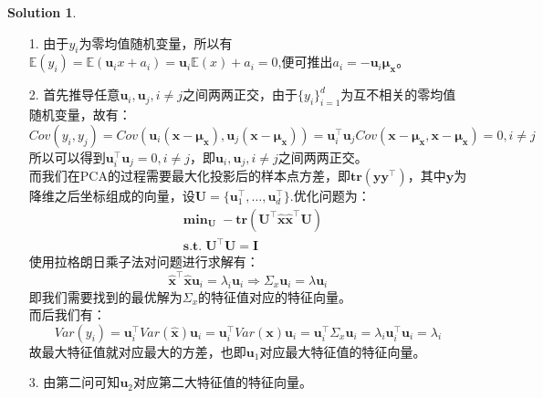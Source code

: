 \documentclass[a4paper,UTF8]{article}
\theoremstyle{definition}
\newtheorem*{solution}{Solution}
\begin{document}
\begin{solution}
	\begin{enumerate}
		\item [1.]
		      由于$y_i$为零均值随机变量，所以有$\mathbb{E}(y_i) = \mathbb{E}(\boldsymbol{u}_i x+a_i) =\boldsymbol{u}_i\mathbb{E}(x)+a_i = 0$,便可推出$a_i=-\boldsymbol{u}_i\boldsymbol{\mu}_{\boldsymbol{x}}$。
		\item [2.]
		      首先推导任意$\boldsymbol{u}_i,\boldsymbol{u}_j,i\neq j$之间两两正交，由于$\{y_i\}_{i=1}^d$为互不相关的零均值随机变量，故有：
		      \[Cov(y_i,y_j) = Cov(\boldsymbol{u}_i(\boldsymbol{x}-\boldsymbol{\mu}_{\boldsymbol{x}}),\boldsymbol{u}_j(\boldsymbol{x}-\boldsymbol{\mu}_{\boldsymbol{x}})) = \boldsymbol{u}_i^{\top}\boldsymbol{u}_jCov(\boldsymbol{x}-\boldsymbol{\mu}_{\boldsymbol{x}},\boldsymbol{x}-\boldsymbol{\mu}_{\boldsymbol{x}}) = 0,i\neq j\]
		      所以可以得到$\boldsymbol{u}_i^{\top}\boldsymbol{u}_j = 0,i\neq j$，即$\boldsymbol{u}_i,\boldsymbol{u}_j,i\neq j$之间两两正交。\\
		      而我们在PCA的过程需要最大化投影后的样本点方差，即$\textbf{tr}(\boldsymbol{y}\boldsymbol{y}^{\top})$，其中$\boldsymbol{y}$为降维之后坐标组成的向量，设$\boldsymbol{U} = \{\boldsymbol{u}_1^{\top},\ldots,\boldsymbol{u}_d^{\top}\}$.优化问题为：
		      \begin{align*}
			       & \textbf{min}_{\boldsymbol{U}}\; -\textbf{tr}(\boldsymbol{U}^{\top}\hat{\boldsymbol{x}}\hat{\boldsymbol{x}}^{\top}\boldsymbol{U}) \\
			       & \textbf{s.t.}\; \boldsymbol{U}^{\top}\boldsymbol{U} =\boldsymbol{I}
		      \end{align*}
		      使用拉格朗日乘子法对问题进行求解有：
		      \[\hat{\boldsymbol{x}}^{\top}\hat{\boldsymbol{x}}\boldsymbol{u}_i = \lambda_i \boldsymbol{u}_i \Rightarrow \Sigma_x\boldsymbol{u}_i = \lambda\boldsymbol{u}_i\]
		      即我们需要找到的最优解为$\Sigma_x$的特征值对应的特征向量。\\
		      而后我们有：
		      \[Var(y_i) = \boldsymbol{u}_i^{\top}Var(\hat{\boldsymbol{x}})\boldsymbol{u}_i = \boldsymbol{u}_i^{\top}Var(\boldsymbol{x})\boldsymbol{u}_i = \boldsymbol{u}_i^{\top}\Sigma_x\boldsymbol{u}_i = \lambda_i\boldsymbol{u}_i^{\top}\boldsymbol{u}_i = \lambda_i\]
		      故最大特征值就对应最大的方差，也即$\boldsymbol{u}_1$对应最大特征值的特征向量。
		\item [3.]
		      由第二问可知$\boldsymbol{u}_2$对应第二大特征值的特征向量。
	\end{enumerate}
\end{solution}
\end{document}
